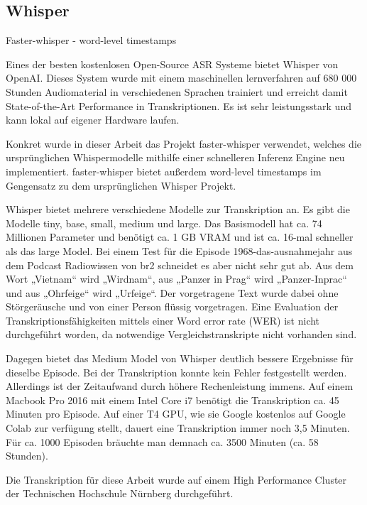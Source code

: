 \subsection{Whisper}

Faster-whisper - word-level timestamps

Eines der besten kostenlosen Open-Source ASR Systeme bietet Whisper von OpenAI. 
Dieses System wurde mit einem maschinellen lernverfahren auf 680 000 Stunden Audiomaterial in verschiedenen Sprachen trainiert und erreicht damit State-of-the-Art Performance in Transkriptionen.
Es ist sehr leistungsstark und kann lokal auf eigener Hardware laufen. \cite{radford}

Konkret wurde in dieser Arbeit das Projekt faster-whisper \cite{faster-whisper2024} verwendet, welches die ursprünglichen Whispermodelle mithilfe einer schnelleren Inferenz Engine neu implementiert.
faster-whisper bietet außerdem word-level timestamps im Gengensatz zu dem ursprünglichen Whisper Projekt.

Whisper bietet mehrere verschiedene Modelle zur Transkription an. 
Es gibt die Modelle tiny, base, small, medium und large. 
Das Basismodell hat ca. 74 Millionen Parameter und benötigt ca. 1 GB VRAM und ist ca. 16-mal schneller als das large Model. 
Bei einem Test für die Episode 1968-das-ausnahmejahr aus dem Podcast Radiowissen von br2 schneidet es aber nicht sehr gut ab. 
Aus dem Wort „Vietnam“ wird „Wirdnam“, aus „Panzer in Prag“ wird „Panzer-Inprac“ und aus  „Ohrfeige“ wird „Urfeige“. 
Der vorgetragene Text wurde dabei ohne Störgeräusche und von einer Person flüssig vorgetragen. 
Eine Evaluation der Transkriptionsfähigkeiten mittels einer Word error rate (WER) ist nicht durchgeführt worden, da notwendige Vergleichstranskripte nicht vorhanden sind.

Dagegen bietet das Medium Model von Whisper deutlich bessere Ergebnisse für dieselbe Episode. 
Bei der Transkription konnte kein Fehler festgestellt werden. 
Allerdings ist der Zeitaufwand durch höhere Rechenleistung immens. 
Auf einem Macbook Pro 2016 mit einem Intel Core i7 benötigt die Transkription ca. 45 Minuten pro Episode. 
Auf einer T4 GPU, wie sie Google kostenlos auf Google Colab zur verfügung stellt, dauert eine Transkription immer noch 3,5 Minuten. 
Für ca. 1000 Episoden bräuchte man demnach ca. 3500 Minuten (ca. 58 Stunden). 

Die Transkription für diese Arbeit wurde auf einem High Performance Cluster der Technischen Hochschule Nürnberg durchgeführt.



